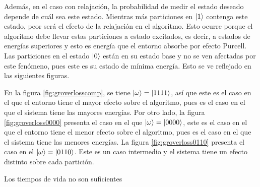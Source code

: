 Además, en el caso con relajación, la probabilidad de medir el estado deseado depende de cuál sea este estado. Mientras más particiones en $\ket{1}$ contenga este estado, peor será el efecto de la relajación en el algoritmo. Esto ocurre porque el algoritmo debe llevar estas particiones a estado excitados, es decir, a estados de energías superiores y esto es energía que el entorno absorbe por efecto Purcell. Las particiones en el estado $\ket{0}$ están en su estado base y no se ven afectadas por este fenómeno, pues este es su estado de mínima energía. Esto se ve reflejado en las siguientes figuras.

En la figura \ref{fig:groverlosscomp}, se tiene $\ket{\omega} = \ket{1111}$, así que este es el caso en el que el entorno tiene el mayor efecto sobre el algoritmo, pues es el caso en el que el sistema tiene las mayores energías. Por otro lado, la figura \ref{fig:groverloss0000} presenta el caso en el que $\ket{\omega} = \ket{0000}$, este es el caso en el que el entorno tiene el menor efecto sobre el algoritmo, pues es el caso en el que el sistema tiene las menores energías. La figura \ref{fig:groverloss0110} presenta el caso en el $\ket{\omega} = \ket{0110}$. Este es un caso intermedio y el sistema tiene un efecto distinto sobre cada partición.

\color{red}Los tiempos de vida no son suficientes\color{black}

